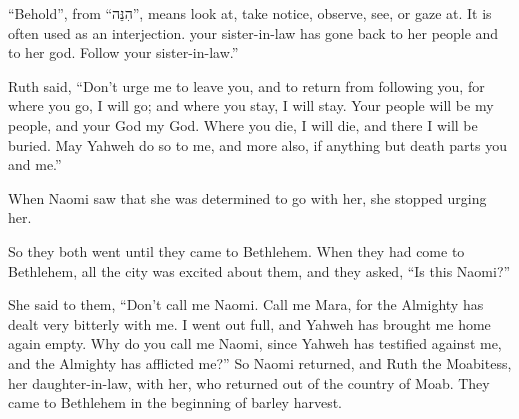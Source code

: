 {{“Behold”, from “הִנֵּה”, means look at, take notice, observe, see, or gaze at. It is often used as an interjection.} your sister-in-law has gone back to her people and to her god. Follow your sister-in-law.”
\par }{\PP {}Ruth said, “Don’t urge me to leave you, and to return from following you, for where you go, I will go; and where you stay, I will stay. Your people will be my people, and your God my God.
Where you die, I will die, and there I will be buried. May Yahweh do so to me, and more also, if anything but death parts you and me.”
\par }{\PP {}When Naomi saw that she was determined to go with her, she stopped urging her.
\par }{\PP {}So they both went until they came to Bethlehem. When they had come to Bethlehem, all the city was excited about them, and they asked, “Is this Naomi?”
\par }{\PP {}She said to them, “Don’t call me Naomi. Call me Mara, for the Almighty has dealt very bitterly with me.
I went out full, and Yahweh has brought me home again empty. Why do you call me Naomi, since Yahweh has testified against me, and the Almighty has afflicted me?”
So Naomi returned, and Ruth the Moabitess, her daughter-in-law, with her, who returned out of the country of Moab. They came to Bethlehem in the beginning of barley harvest.

}
